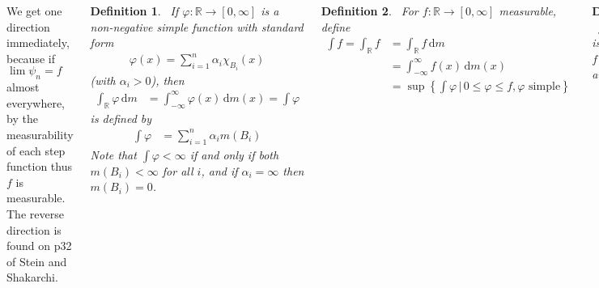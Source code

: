 \documentclass{tikzposter} %
\newtheorem{theorem}{Theorem}
\newtheorem{definition}{Definition}
\begin{document}
\begin{columns}
{    We get one direction immediately, because if $\lim \psi_{n} = f$ almost everywhere, by the measurability of each step function thus $f$ is measurable. The reverse direction is found on p32 of Stein and Shakarchi. \\

    \begin{definition}
    \ If $\varphi : \mathbb{R} \to [0,\infty]$ is a non-negative simple function with standard form
    \begin{align*}
      \varphi(x) = \sum_{i=1}^{n} \alpha_{i}\chi_{B_{i}} (x)
    \end{align*}
    (with $\alpha_{i} > 0$), then
    \begin{align*}
      \int_{\mathbb{R}} \varphi \, \mathrm{d}m &= \int_{-\infty}^{\infty} \varphi(x) \, \mathrm{d}m(x) = \int \varphi
    \end{align*}
    is defined by
    \begin{align*}
      \int \varphi &= \sum_{i=1}^{n} \alpha_{i} m(B_{i})
    \end{align*}
    Note that $\int \varphi < \infty$ if and only if both $m(B_{i}) < \infty$ for all $i$, and if $\alpha_{i} = \infty$ then $m(B_{i}) = 0$.
    \end{definition}
    \hphantom{}

    \begin{definition}
      \ For $f : \mathbb{R} \to [0,\infty]$ measurable, define
      \begin{align*}
        \int f = \int_{\mathbb{R}} f &= \int_{\mathbb{R}} f \, \mathrm{d}m \\
        &= \int_{-\infty}^{\infty} f(x) \, \mathrm{d}m(x) \\
        &= \sup \left\{\int \varphi \,\Big|\, 0 \le \varphi \le f, \varphi \,\,\mathrm{ simple}\right\}
      \end{align*}
    \end{definition}
    \hphantom{}

    \begin{definition}
    \ $f : \mathbb{R} \to [0,\infty]$ is integrable if $f$ is measurable and $\int_{\mathbb{R}} f < \infty$.
    \end{definition}
    \hphantom{}

    \begin{theorem}[Monotone convergence theorem]
    \ If $(f_{n})$ is an increasing sequence of non-negative measurable functions and $f = \lim f_{n}$, then $\int f = \lim \int f_{n}$.
    \end{theorem}
    \hphantom{}

}
\end{columns}
\end{document}
